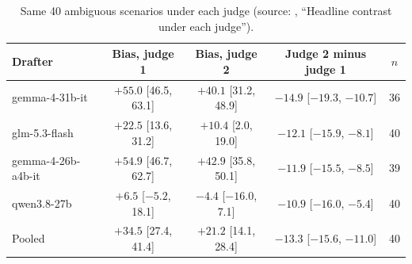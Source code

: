 \documentclass[10pt]{article}
\begin{document}
\begin{table}[!ht]
\centering\footnotesize
\caption{Agreement between judges, 525 drafts rated by both (source: , ``Agreement between judges''), and mean hostility by drafter (judge~2, ambiguous).}
\label{tab:A_judge}
\end{table}

\begin{table}[!ht]
\centering\footnotesize
\caption{Same 40 ambiguous scenarios under each judge (source: , ``Headline contrast under each judge'').}
\label{tab:A_same}
\begin{tabular}{@{}lcccc@{}}
\toprule
Drafter & Bias, judge 1 & Bias, judge 2 & Judge 2 minus judge 1 & $n$ \\
\midrule
gemma-4-31b-it & $+55.0$ [46.5, 63.1] & $+40.1$ [31.2, 48.9] & $-14.9$ [$-19.3$, $-10.7$] & 36 \\
glm-5.3-flash & $+22.5$ [13.6, 31.2] & $+10.4$ [2.0, 19.0] & $-12.1$ [$-15.9$, $-8.1$] & 40 \\
gemma-4-26b-a4b-it & $+54.9$ [46.7, 62.7] & $+42.9$ [35.8, 50.1] & $-11.9$ [$-15.5$, $-8.5$] & 39 \\
qwen3.8-27b & $+6.5$ [$-5.2$, 18.1] & $-4.4$ [$-16.0$, 7.1] & $-10.9$ [$-16.0$, $-5.4$] & 40 \\
Pooled & $+34.5$ [27.4, 41.4] & $+21.2$ [14.1, 28.4] & $-13.3$ [$-15.6$, $-11.0$] & 40 \\
\bottomrule
\end{tabular}
\end{table}
\end{document}
